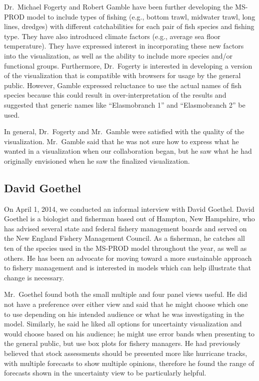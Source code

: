 Dr.\ Michael Fogerty and Robert Gamble have been further developing the MS-PROD model to include types of fishing (e.g., bottom trawl, midwater trawl, long lines, dredges) with different catchabilities for each pair of fish species and fishing type.  They have also introduced climate factors (e.g., average sea floor temperature).  They have expressed interest in incorporating these new factors into the visualization, as well as the ability to include more species and/or functional groups.  Furthermore, Dr.\ Fogerty is interested in developing a version of the visualization that is compatible with browsers for usage by the general public.  However, Gamble expressed reluctance to use the actual names of fish species because this could result in over-interpretation of the results and suggested that generic names like ``Elasmobranch 1'' and ``Elasmobranch 2'' be used.

In general, Dr.\ Fogerty and Mr.\ Gamble were satisfied with the quality of the visualization.  Mr.\ Gamble said that he was not sure how to express what he wanted in a visualization when our collaboration began, but he saw what he had originally envisioned when he saw the finalized visualization.  

\subsection{David Goethel}

On April 1, 2014, we conducted an informal interview with David Goethel.  David Goethel is a biologist and fisherman based out of Hampton, New Hampshire, who has advised several state and federal fishery management boards and served on the New England Fishery Management Council.  As a fisherman, he catches all ten of the species used in the MS-PROD model throughout the year, as well as others.  He has been an advocate for moving toward a more sustainable approach to fishery management and is interested in models which can help illustrate that change is necessary.  

Mr.\ Goethel found both the small multiple and four panel views useful.  He did not have a preference over either view and said that he might choose which one to use depending on his intended audience or what he was investigating in the model.  Similarly, he said he liked all options for uncertainty visualization and would choose based on his audience; he might use error bands when presenting to the general public, but use box plots for fishery managers.  He had previously believed that stock assessments should be presented more like hurricane tracks, with multiple forecasts to show multiple opinions, therefore he found the range of forecasts shown in the uncertainty view to be particularly helpful.

